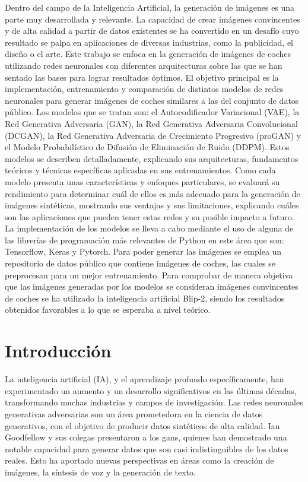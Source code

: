 Dentro del campo de la Inteligencia Artificial, la generación de imágenes es una
parte muy desarrollada y relevante. La capacidad de crear imágenes
convincentes y de alta calidad a partir de datos existentes se ha convertido en
un desafío cuyo resultado se palpa en aplicaciones de diversas industrias, como
la publicidad, el diseño o el arte.
Este trabajo se enfoca en la generación de imágenes de coches utilizando redes
neuronales con diferentes arquitecturas sobre las que se han sentado las bases
para lograr resultados óptimos.
El objetivo principal es la implementación, entrenamiento y comparación de
distintos modelos de redes neuronales para generar imágenes de coches
similares a las del conjunto de datos público. Los modelos que se tratan son: el
Autocodificador Variacional (VAE), la Red Generativa Adversaria (GAN), la Red
Generativa Adversaria Convolucional (DCGAN), la Red Generativa Adversaria de
Crecimiento Progresivo (proGAN) y el Modelo Probabilístico de Difusión de
Eliminación de Ruido (DDPM). Estos modelos se describen detalladamente,
explicando sus arquitecturas, fundamentos teóricos y técnicas específicas
aplicadas en sus entrenamientos. Como cada modelo presenta unas
características y enfoques particulares, se evaluará su rendimiento para
determinar cuál de ellos es más adecuado para la generación de imágenes
sintéticas, mostrando sus ventajas y sus limitaciones, explicando cuáles son las
aplicaciones que pueden tener estas redes y su posible impacto a futuro. La
implementación de los modelos se lleva a cabo mediante el uso de alguna de las
librerías de programación más relevantes de Python en este área que son:
Tensorflow, Keras y Pytorch. Para poder generar las imágenes se emplea un
repositorio de datos público que contiene imágenes de coches, las cuales se
preprocesan para un mejor entrenamiento.
Para comprobar de manera objetiva que las imágenes generadas por los modelos
se consideran imágenes convincentes de coches se ha utilizado la inteligencia
artificial Blip-2, siendo los resultados obtenidos favorables a lo que se esperaba
a nivel teórico.
\tableofcontents %
\newpage
\thispagestyle{empty} %
\mbox{} %

\section{Introducción}\label{sec:introduccion}

La inteligencia artificial (IA), y el aprendizaje profundo específicamente, han experimentado un aumento y un desarrollo significativos en las últimas décadas, transformando muchas industrias y campos de investigación. Las redes neuronales generativas adversarias son un área prometedora en la ciencia de datos generativos, con el objetivo de producir datos sintéticos de alta calidad. Ian Goodfellow y sus colegas presentaron a los gans, quienes han demostrado una notable capacidad para generar datos que son casi indistinguibles de los datos reales. Esto ha aportado nuevas perspectivas en áreas como la creación de imágenes, la síntesis de voz y la generación de texto.

